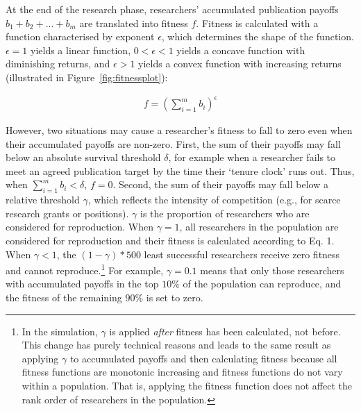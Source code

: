 \documentclass[
  ,man,mask,floatsintext]{apa6}
\begin{document}
At the end of the research phase, researchers' accumulated publication payoffs \(b_1 + b_2 + ... + b_m\) are translated into fitness \(f\).
Fitness is calculated with a function characterised by exponent \(\epsilon\), which determines the shape of the function. \(\epsilon = 1\) yields a linear function, \(0 < \epsilon < 1\) yields a concave function with diminishing returns, and \(\epsilon > 1\) yields a convex function with increasing returns (illustrated in Figure~\ref{fig:fitnessplot}):

\begin{align}
f = (\sum_{i=1}^{m} b_i)^\epsilon
\end{align}

However, two situations may cause a researcher's fitness to fall to zero even when their accumulated payoffs are non-zero.
First, the sum of their payoffs may fall below an absolute survival threshold \(\delta\), for example when a researcher fails to meet an agreed publication target by the time their `tenure clock' runs out.
Thus, when \(\sum_{i=1}^{m} b_i < \delta\), \(f = 0\).
Second, the sum of their payoffs may fall below a relative threshold \(\gamma\), which reflects the intensity of competition (e.g., for scarce research grants or positions).
\(\gamma\) is the proportion of researchers who are considered for reproduction.
When \(\gamma = 1\), all researchers in the population are considered for reproduction and their fitness is calculated according to Eq. 1.
When \(\gamma < 1\), the \((1 - \gamma)*500\) least successful researchers receive zero fitness and cannot reproduce.\footnote{In the simulation, \(\gamma\) is applied \emph{after} fitness has been calculated, not before. This change has purely technical reasons and leads to the same result as applying \(\gamma\) to accumulated payoffs and then calculating fitness because all fitness functions are monotonic increasing and fitness functions do not vary within a population. That is, applying the fitness function does not affect the rank order of researchers in the population.}
For example, \(\gamma = 0.1\) means that only those researchers with accumulated payoffs in the top \(10\%\) of the population can reproduce, and the fitness of the remaining \(90\%\) is set to zero.
\end{document}
